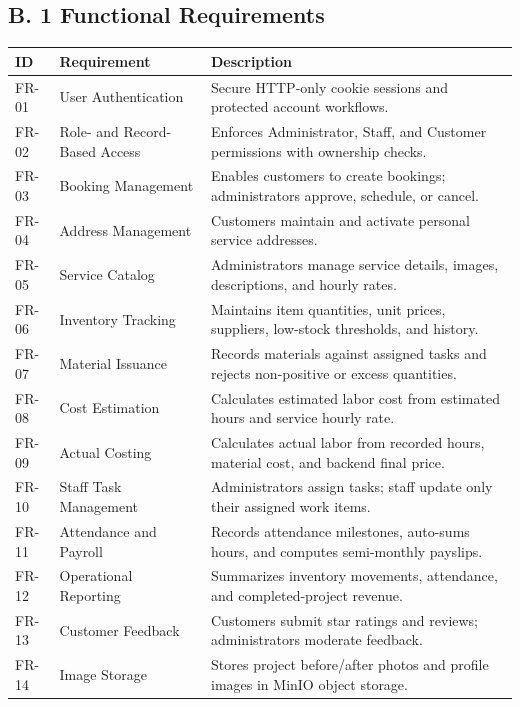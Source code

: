 \documentclass[12pt, letterpaper]{article}
\begin{document}
\newpage


\subsection*{B. 1 Functional Requirements}


\begin{table}[h]
\centering
\small

\begin{tabular}{p{1.8cm} p{4.2cm} p{8cm}}
\toprule
\textbf{ID} & \textbf{Requirement} & \textbf{Description}  \\
\midrule
FR-01 & User Authentication & Secure HTTP-only cookie sessions and protected account workflows. \\
FR-02 & Role- and Record-Based Access & Enforces Administrator, Staff, and Customer permissions with ownership checks. \\
FR-03 & Booking Management & Enables customers to create bookings; administrators approve, schedule, or cancel. \\
FR-04 & Address Management & Customers maintain and activate personal service addresses. \\
FR-05 & Service Catalog & Administrators manage service details, images, descriptions, and hourly rates. \\
FR-06 & Inventory Tracking & Maintains item quantities, unit prices, suppliers, low-stock thresholds, and history. \\
FR-07 & Material Issuance & Records materials against assigned tasks and rejects non-positive or excess quantities. \\
FR-08 & Cost Estimation & Calculates estimated labor cost from estimated hours and service hourly rate. \\
FR-09 & Actual Costing & Calculates actual labor from recorded hours, material cost, and backend final price. \\
FR-10 & Staff Task Management & Administrators assign tasks; staff update only their assigned work items. \\
FR-11 & Attendance and Payroll & Records attendance milestones, auto-sums hours, and computes semi-monthly payslips. \\
FR-12 & Operational Reporting & Summarizes inventory movements, attendance, and completed-project revenue. \\
FR-13 & Customer Feedback & Customers submit star ratings and reviews; administrators moderate feedback. \\
FR-14 & Image Storage & Stores project before/after photos and profile images in MinIO object storage. \\
\bottomrule
\end{tabular}
\end{table}
\end{document}
